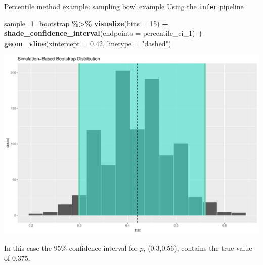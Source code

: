 \documentclass[
  ignorenonframetext,
]{beamer}
\newenvironment{Shaded}{\begin{snugshade}}{\end{snugshade}}
\newcommand{\AttributeTok}[1]{\textcolor[rgb]{0.13,0.29,0.53}{#1}}
\newcommand{\DecValTok}[1]{\textcolor[rgb]{0.00,0.00,0.81}{#1}}
\newcommand{\FloatTok}[1]{\textcolor[rgb]{0.00,0.00,0.81}{#1}}
\newcommand{\FunctionTok}[1]{\textcolor[rgb]{0.13,0.29,0.53}{\textbf{#1}}}
\newcommand{\NormalTok}[1]{#1}
\newcommand{\SpecialCharTok}[1]{\textcolor[rgb]{0.81,0.36,0.00}{\textbf{#1}}}
\newcommand{\StringTok}[1]{\textcolor[rgb]{0.31,0.60,0.02}{#1}}
\begin{document}
\begin{frame}[fragile]{Percentile method example: sampling bowl example}
\protect\hypertarget{percentile-method-example-sampling-bowl-example-1}{}
Using the \texttt{infer} pipeline

\tiny

\begin{Shaded}
\begin{Highlighting}[]
\NormalTok{sample\_1\_bootstrap }\SpecialCharTok{\%\textgreater{}\%} 
  \FunctionTok{visualize}\NormalTok{(}\AttributeTok{bins =} \DecValTok{15}\NormalTok{) }\SpecialCharTok{+} 
  \FunctionTok{shade\_confidence\_interval}\NormalTok{(}\AttributeTok{endpoints =}\NormalTok{ percentile\_ci\_1) }\SpecialCharTok{+}
  \FunctionTok{geom\_vline}\NormalTok{(}\AttributeTok{xintercept =} \FloatTok{0.42}\NormalTok{, }\AttributeTok{linetype =} \StringTok{"dashed"}\NormalTok{)}
\end{Highlighting}
\end{Shaded}

\begin{center}\includegraphics[width=0.7\linewidth,height=0.45\textheight]{Week10_Lect_files/figure-beamer/unnamed-chunk-22-1} \end{center}
\normalsize

In this case the \(95\%\) confidence interval for \(p\), (0.3,0.56),
contains the true value of 0.375.
\end{frame}
\end{document}
